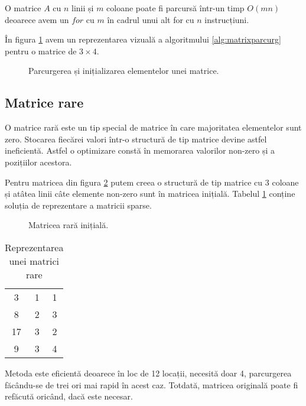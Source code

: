 O matrice $A$ cu $n$ linii și $m$ coloane poate fi parcursă într-un timp $O(mn)$ deoarece avem un $for$ cu $m$ în cadrul unui alt for cu $n$ instrucțiuni.

În figura \ref{fig:parcurgmatrix} avem un reprezentarea vizuală a algoritmului 
\ref{alg:matrixparcurg} pentru o matrice de $3\times4$.
\begin{figure}[H] 
	\centering	
	{
	}
	\caption{Parcurgerea și inițializarea elementelor unei matrice.} 
	\label{fig:parcurgmatrix}
\end{figure}


\subsection{Matrice rare}

O matrice rară este un tip special de matrice în care majoritatea elementelor sunt zero. Stocarea fiecărei valori într-o structură de tip matrice devine astfel ineficientă. Astfel o optimizare constă în memorarea valorilor non-zero și a pozițiilor acestora.

Pentru matricea din figura \ref{fig:sparse} putem creea o structură de tip matrice cu 3 coloane și atâtea linii câte elemente non-zero sunt în matricea inițială. Tabelul \ref{table:sparse} conține soluția de reprezentare a matricii sparse.

\begin{figure}[H] 
	\centering	
	{
	}
	\caption{Matricea rară inițială.} 
	\label{fig:sparse}
\end{figure}



\begin{table}[h]
	\centering
	\begin{tabular}{ c c c }
		3 & 1 & 1 \\ 
		8 & 2 & 3 \\  
		17 & 3 & 2 \\    	
		9 & 3 & 4 
	\end{tabular}
	\caption{Reprezentarea unei matrici rare}
	\label{table:sparse}
\end{table}

Metoda este eficientă deoarece în loc de 12 locații, necesită doar 4, parcurgerea făcându-se de trei ori mai rapid în acest caz. Totdată, matricea originală poate fi refăcută oricând, dacă este necesar.

\newpage


